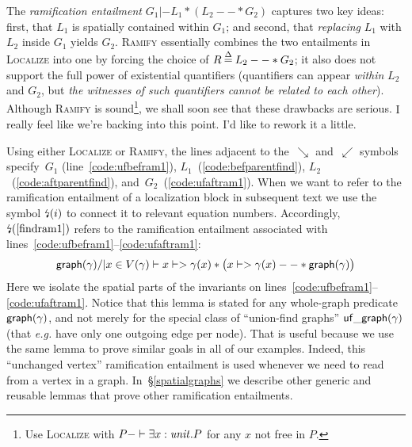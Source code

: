 {\color{magenta}The \emph{ramification entailment} $G_1 |- L_1 * (L_2 --* G_2)$ captures two key ideas: 
first, that $L_1$ is spatially contained within $G_1$; and second, that 
\emph{replacing} $L_1$ with $L_2$ inside $G_1$ yields $G_2$. \textsc{Ramify} essentially 
combines the two entailments in \textsc{Localize} into one by forcing the choice of 
$R \mathbin{\stackrel{\Delta}{=}} L_2 --* G_2$; it also does not support the full power of existential 
quantifiers (quantifiers can appear \emph{within} $L_2$ and $G_2$, but 
\emph{the witnesses of such quantifiers cannot be related to each other}).  
Although \textsc{Ramify} is sound\footnote{Use \textsc{Localize} with 
$P -|- \exists x : \mathit{unit}.P$ for any $x$ not free in $P$.}, 
we shall soon see that these drawbacks are serious.}
{\color{blue} I really feel like we're backing into this point. I'd like
to rework it a little.}

Using either \textsc{Localize} or \textsc{Ramify}, the lines adjacent to 
the~$\searrow$ and~$\swarrow$ symbols specify~$G_1$ (line~\ref{code:ufbefram1}), 
$L_1$~(\ref{code:befparentfind}),
$L_2$~(\ref{code:aftparentfind}), and~$G_2$~(\ref{code:ufaftram1}). 
When we want to refer to the ramification entailment of a localization block in 
subsequent text we use the symbol $\mbox{\lightning}(i)$ to connect it to relevant equation 
numbers.  Accordingly, $\mbox{\lightning}(\ref{findram1})$ refers to the ramification entailment 
associated with lines~\ref{code:ufbefram1}--\ref{code:ufaftram1}:
\begin{equation}
\label{findram1}
\mathsf{graph}(\gamma) /| x \in V(\gamma) |- x |-> \gamma(x) * \big(x |-> \gamma(x) --* \mathsf{graph}(\gamma)\big)
\end{equation}
Here we isolate the spatial parts of the invariants on lines~\ref{code:ufbefram1}--\ref{code:ufaftram1}.  Notice that this lemma is stated for any whole-graph predicate $\mathsf{graph}(\gamma)$, and not merely for the special class of ``union-find graphs'' $\mathsf{uf\_graph}(\gamma)$ (that \emph{e.g.} have only one outgoing edge per node).  That is useful because we use the same lemma to prove similar goals in all of our examples.
Indeed, this ``unchanged vertex'' ramification entailment is used whenever we need to read from a vertex in a graph.  In~\S\ref{spatialgraphs} we describe other generic and reusable lemmas that prove other ramification entailments.

